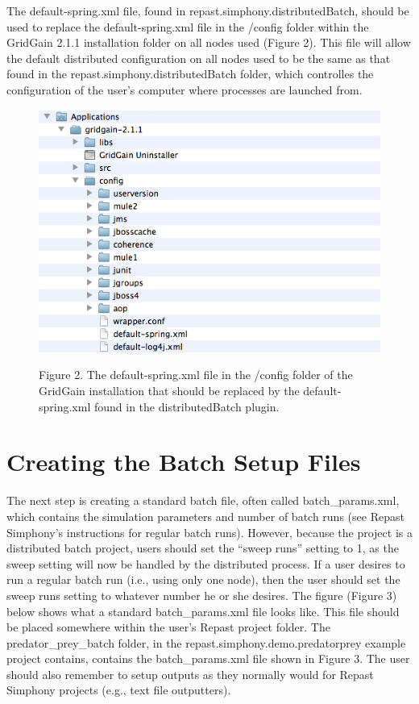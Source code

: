 \documentclass[12pt]{article}
\begin{document}
The default-spring.xml file, found in
repast.simphony.distributedBatch, should be used to replace the
default-spring.xml file in the /config folder within the GridGain
2.1.1 installation folder on all nodes used (Figure 2). This file will allow the default
distributed configuration on all nodes used to be the same as that
found in the
repast.simphony.distributedBatch folder, which controlles the
configuration of the user's computer where processes are launched
from.

\begin{figure}[!t]
\begin{center}
\includegraphics [width=\textwidth]{images/Figure2.jpg}
\label{cablehealth}
\begin{minipage}{.9\textwidth}Figure 2. The default-spring.xml file in
  the /config folder of the GridGain installation
  that should be replaced by the default-spring.xml found in the
  distributedBatch plugin.
\end{minipage}
\end{center}
\end{figure}

\section{Creating the Batch Setup Files}

The next step is creating a standard batch file, often called
batch\_params.xml, which contains the simulation parameters and number
of batch runs (see Repast Simphony's instructions for regular batch
runs). However, because the project is a distributed batch project,
users should set the ``sweep runs'' setting to 1, as the sweep setting
will now be handled by the distributed process. If a user desires to
run a regular batch run (i.e., using only one node), then the user
should set the sweep runs setting to whatever number he or she
desires. The figure (Figure 3) below shows what a standard
batch\_params.xml file looks like. This file should be placed
somewhere within the user's Repast project folder. The
predator\_prey\_batch folder, in the repast.simphony.demo.predatorprey
example project contains, contains the batch\_params.xml file shown in
Figure 3. The user should also remember to setup outputs as they normally would for Repast Simphony projects (e.g., text file outputters).
\end{document}
